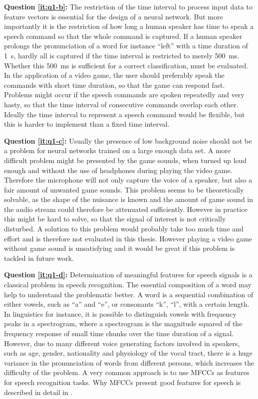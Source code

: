 \textbf{Question \ref{it:q1-b}:} 
The restriction of the time interval to process input data to feature vectors is essential for the design of a neural network.
But more importantly it is the restriction of how long a human speaker has time to speak a speech command so that the whole command is captured. 
If a human speaker prolongs the pronunciation of a word for instance \enquote{left} with a time duration of \SI{1}{\second}, hardly all is captured if the time interval is restricted to merely \SI{500}{\milli\second}.
Whether this \SI{500}{\milli\second} is sufficient for a correct classification, must be evaluated.
In the application of a video game, the user should preferably speak the commands with short time duration, so that the game can respond fast.
Problems might occur if the speech commands are spoken repeatedly and very hasty, so that the time interval of consecutive commands overlap each other.
Ideally the time interval to represent a speech command would be flexible, but this is harder to implement than a fixed time interval.

\textbf{Question \ref{it:q1-c}:}
Usually the presence of low background noise should not be a problem for neural networks trained on a large enough data set. 
A more difficult problem might be presented by the game sounds, when turned up loud enough and without the use of headphones during playing the video game. 
Therefore the microphone will not only capture the voice of a speaker, but also a fair amount of unwanted game sounds. 
This problem seems to be theoretically solvable, as the shape of the nuisance is known and the amount of game sound in the audio stream could therefore be attenuated sufficiently.
However in practice this might be hard to solve, so that the signal of interest is not critically disturbed.
A solution to this problem would probably take too much time and effort and is therefore not evaluated in this thesis. 
However playing a video game without game sound is unsatisfying and it would be great if this problem is tackled in future work.

\textbf{Question \ref{it:q1-d}:} 
Determination of meaningful features for speech signals is a classical problem in speech recognition.
The essential composition of a word may help to understand the problematic better.
A word is a sequential combination of either vowels, such as \enquote{a} and \enquote{e}, or consonants \enquote{k}, \enquote{l}, with a certain length. 
In linguistics for instance, it is possible to distinguish vowels with frequency peaks in a spectrogram, where a spectrogram is the magnitude squared of the frequency response of small time chunks over the time duration of a signal.
However, due to many different voice generating factors involved in speakers, such as age, gender, nationality and physiology of the vocal tract, there is a huge variance in the pronunciation of words from different persons, which increases the difficulty of the problem.
A very common approach is to use MFCCs as features for speech recognition tasks.
Why MFCCs present good features for speech is described in detail in .


